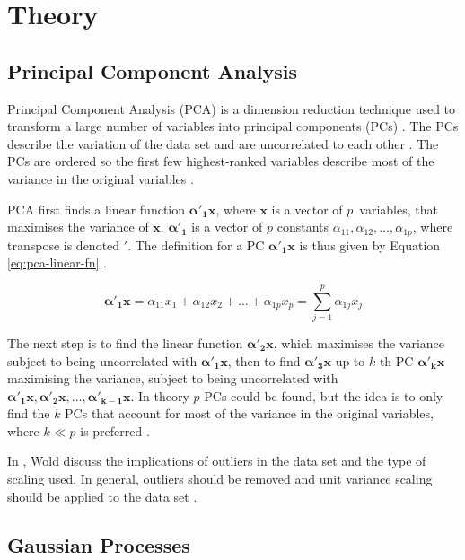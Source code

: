 \chapter{Theory}
\label{cha:theory}

\section{Principal Component Analysis}
Principal Component Analysis (PCA) is a dimension reduction technique used to transform a large number of variables into principal components (PCs) \cite{Jolliffe2002, Wold1987}.
The PCs describe the variation of the data set and are uncorrelated to each other \cite{Jolliffe2002}.
The PCs are ordered so the first few highest-ranked variables describe most of the variance in the original variables \cite{Wold1987}.

PCA first finds a linear function $\bm{\alpha'_1x}$, where $\bm{x}$ is a vector of $p$ variables, that maximises the variance of $\bm{x}$.
$\bm{\alpha'_1}$ is a vector of $p$ constants $\alpha_{11}, \alpha_{12}, \dots, \alpha_{1p}$, where transpose is denoted $'$.
The definition for a PC $\bm{\alpha'_1x}$ is thus given by Equation \ref{eq:pca-linear-fn} \cite{Jolliffe2002}.

\begin{equation} \label{eq:pca-linear-fn}
    \bm{\alpha'_1x} = \alpha_{11}x_1 + \alpha_{12}x_2 + \dots + \alpha_{1p}x_p = \sum_{j=1}^{p}\alpha_{1j}x_j
\end{equation}

The next step is to find the linear function $\bm{\alpha'_2x}$, which maximises the variance subject to being uncorrelated with $\bm{\alpha'_1x}$, then to find $\bm{\alpha'_3x}$ up to $k$-th PC $\bm{\alpha'_kx}$ maximising the variance, subject to being uncorrelated with $\bm{\alpha'_1x}, \bm{\alpha'_2x}, \dots, \bm{\alpha'_{k-1}x}$.
In theory $p$ PCs could be found, but the idea is to only find the $k$ PCs that account for most of the variance in the original variables, where $k \ll p$ is preferred \cite{Jolliffe2002}.

In \cite{Wold1987}, Wold discuss the implications of outliers in the data set and the type of scaling used.
In general, outliers should be removed and unit variance scaling should be applied to the data set \cite{Wold1987}.

\section{Gaussian Processes}

